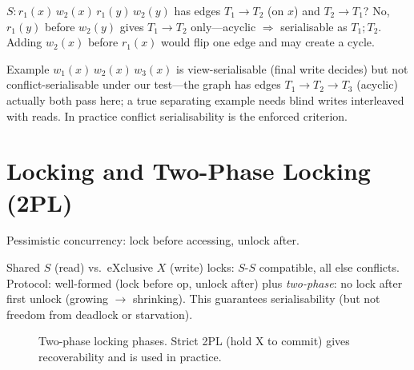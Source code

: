 \begin{example}
$S: r_1(x)\,w_2(x)\,r_1(y)\,w_2(y)$ has edges $T_1\to T_2$ (on $x$) and $T_2\to T_1$? No, $r_1(y)$ before $w_2(y)$ gives $T_1\to T_2$ only---acyclic $\Rightarrow$ serialisable as $T_1;T_2$. Adding $w_2(x)$ before $r_1(x)$ would flip one edge and may create a cycle.
\end{example}

\begin{remark}
Example $w_1(x)\,w_2(x)\,w_3(x)$ is view-serialisable (final write decides) but not conflict-serialisable under our test---the graph has edges $T_1\to T_2\to T_3$ (acyclic) actually both pass here; a true separating example needs blind writes interleaved with reads. In practice conflict serialisability is the enforced criterion.
\end{remark}

\section{Locking and Two-Phase Locking (2PL)}
\label{sec:2pl}

Pessimistic concurrency: lock before accessing, unlock after.

Shared $S$ (read) vs.\ eXclusive $X$ (write) locks: $S$-$S$ compatible, all else conflicts. Protocol: well-formed (lock before op, unlock after) plus \emph{two-phase}: no lock after first unlock (growing $\to$ shrinking). This guarantees serialisability (but not freedom from deadlock or starvation).

\begin{figure}[h]
\centering
{}
\caption{Two-phase locking phases. Strict 2PL (hold X to commit) gives recoverability and is used in practice.}
\label{fig:2pl}
\end{figure}

